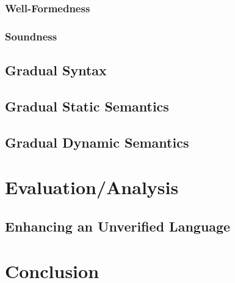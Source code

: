     \subsection{Well-Formedness}
    \label{sec:well-formedness}
    
    
    \subsection{Soundness}
    \label{ssec:soundness}
    

\section{Gradual Syntax}
\label{sec:cs-gradual-formulas}


%

\section{Gradual Static Semantics}
\label{sec:gradualize-hoare-rules}


\section{Gradual Dynamic Semantics}
\label{sec:gradual-dyn--semantics}





\chapter{Evaluation/Analysis}
\label{ch:evaluation-analysis}


\section{Enhancing an Unverified Language}
\label{sec:enhancing-an-unverified}



\chapter{Conclusion}
\label{ch:conclusion}


